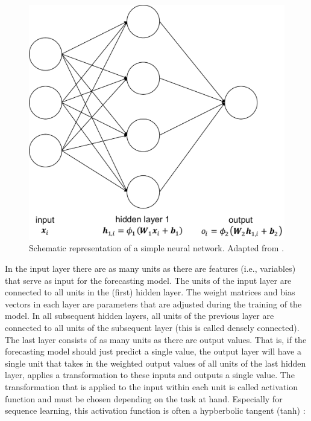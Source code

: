 \begin{figure}[htbp]
    \centering
    \includegraphics[scale=0.5]{thesis/figures/simpleNN.pdf}
    \caption[Schematic representation of a simple neural network]{Schematic representation of a simple neural network. Adapted from \citet{Gan:2017}.}
    \label{Fig:simpleNN}
\end{figure}

In the input layer there are as many units as there are features (i.e., variables) that serve as input for the forecasting model. The units of the input layer are connected to all units in the (first) hidden layer. The weight matrices and bias vectors in each layer are parameters that are adjusted during the training of the model. In all subsequent hidden layers, all units of the previous layer are connected to all units of the subsequent layer (this is called densely connected). The last layer consists of as many units as there are output values. That is, if the forecasting model should just predict a single value, the output layer will have a single unit that takes in the weighted output values of all units of the last hidden layer, applies a transformation to these inputs and outputs a single value. The transformation that is applied to the input within each unit is called activation function and must be chosen depending on the task at hand. Especially for sequence learning, this activation function is often a hypberbolic tangent (tanh) \citep{Lipton:2015}:


